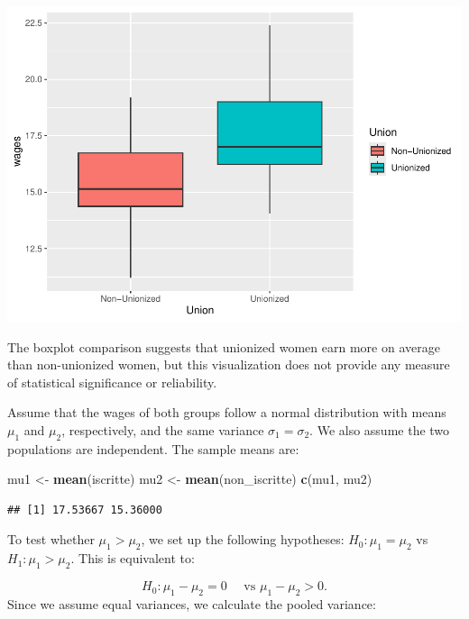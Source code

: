 \documentclass[
]{article}
\newenvironment{Shaded}{\begin{snugshade}}{\end{snugshade}}
\newcommand{\FunctionTok}[1]{\textcolor[rgb]{0.13,0.29,0.53}{\textbf{#1}}}
\newcommand{\NormalTok}[1]{#1}
\newcommand{\OtherTok}[1]{\textcolor[rgb]{0.56,0.35,0.01}{#1}}
\begin{document}
\includegraphics{Hypothesis_Testing_files/figure-latex/unnamed-chunk-29-2.pdf}

The boxplot comparison suggests that unionized women earn more on
average than non-unionized women, but this visualization does not
provide any measure of statistical significance or reliability.

Assume that the wages of both groups follow a normal distribution with
means \(\mu_1\) and \(\mu_2\), respectively, and the same variance
\(\sigma_1 = \sigma_2\). We also assume the two populations are
independent. The sample means are:

\begin{Shaded}
\begin{Highlighting}[]
\NormalTok{mu1 }\OtherTok{\textless{}{-}} \FunctionTok{mean}\NormalTok{(iscritte)}
\NormalTok{mu2 }\OtherTok{\textless{}{-}} \FunctionTok{mean}\NormalTok{(non\_iscritte)}
\FunctionTok{c}\NormalTok{(mu1, mu2)}
\end{Highlighting}
\end{Shaded}

\begin{verbatim}
## [1] 17.53667 15.36000
\end{verbatim}

To test whether \(\mu_1 > \mu_2\), we set up the following hypotheses:
\(H_0: \mu_1 = \mu_2\) vs \(H_1: \mu_1 > \mu_2\). This is equivalent to:

\[H_0: \mu_1 - \mu_2 = 0 \quad \mbox{ vs } \mu_1 - \mu_2 > 0.\] Since we
assume equal variances, we calculate the pooled variance:
\end{document}
